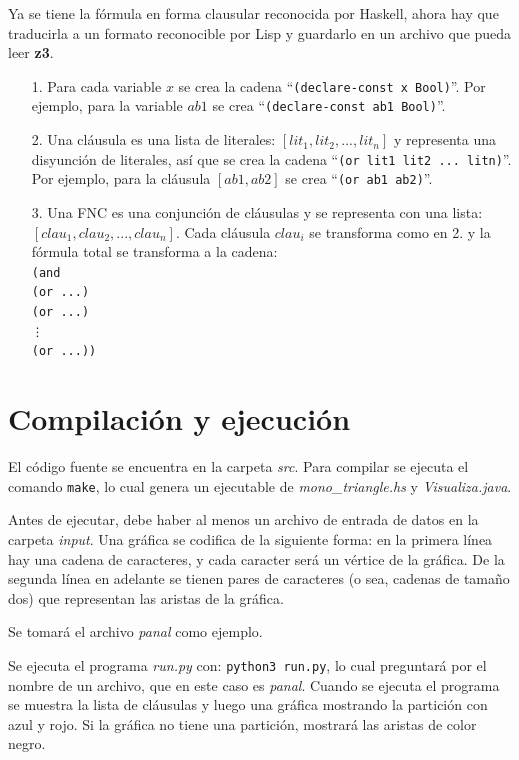 \documentclass{article}
\begin{document}
Ya se tiene la fórmula en forma clausular reconocida por Haskell, ahora hay que traducirla a un formato reconocible por Lisp y guardarlo en un archivo que pueda leer \textbf{z3}.

\begin{itemize}
\item[1.] Para cada variable $x$ se crea la cadena ``\texttt{(declare-const x Bool)}''. Por ejemplo, para la variable $ab1$ se crea ``\texttt{(declare-const ab1 Bool)}''.
\item[2.] Una cláusula es una lista de literales: $[lit_1, lit_2, ..., lit_n]$ y representa una disyunción de literales, así que se crea la cadena ``\texttt{(or lit1 lit2 ... litn)}''. Por ejemplo, para la cláusula $[ab1, ab2]$ se crea ``\texttt{(or ab1 ab2)}''.
\item[3.] Una FNC es una conjunción de cláusulas y se representa con una lista: $[clau_1, clau_2, ... ,clau_n]$. Cada cláusula $clau_i$ se transforma como en 2. y la fórmula total se transforma a la cadena:\\
\texttt{(and\\  (or ...)\\ (or ...)\\ \vdots \\  (or ...))}
\end{itemize}

\section*{Compilación y ejecución}

El código fuente se encuentra en la carpeta \textit{src}. Para compilar se ejecuta el comando \texttt{make}, lo cual genera un ejecutable de \textit{mono\_triangle.hs} y \textit{Visualiza.java}.

Antes de ejecutar, debe haber al menos un archivo de entrada de datos en la carpeta \textit{input}. Una gráfica se codifica de la siguiente forma: en la primera línea hay una cadena de caracteres, y cada caracter será un vértice de la gráfica. De la segunda línea en adelante se tienen pares de caracteres (o sea, cadenas de tamaño dos) que representan las aristas de la gráfica.

Se tomará el archivo \textit{panal} como ejemplo.

Se ejecuta el programa \textit{run.py} con: \texttt{python3 run.py}, lo cual preguntará por el nombre de un archivo, que en este caso es \textit{panal}. Cuando se ejecuta el programa se muestra la lista de cláusulas y luego una gráfica mostrando la partición con azul y rojo. Si la gráfica no tiene una partición, mostrará las aristas de color negro.
\end{document}
